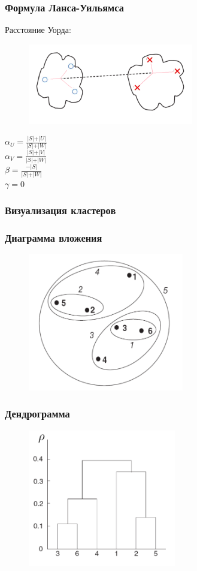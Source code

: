 \documentclass[12pt]{beamer}
\begin{document}
\begin{frame}\frametitle{Формула Ланса-Уильямса}
Расстояние Уорда:\\
\begin{figure}[htbp]
  \includegraphics[height=100pt, keepaspectratio = true]{images/lans4}  
\end{figure}

${\alpha_U = \frac{\vert S \vert + \vert U \vert}{\vert S \vert + \vert W \vert}}$\\${\alpha_V = \frac{\vert S \vert + \vert V \vert}{\vert S \vert + \vert W \vert}}$ \\${\beta = \frac{ -\vert S \vert}{\vert S \vert + \vert W \vert}}$ \\${\gamma = 0}$
\end{frame}

\begin{frame}\frametitle{Визуализация кластеров}
\end{frame}

\begin{frame}\frametitle{Диаграмма вложения}
\begin{figure}[htbp]
  \includegraphics[height=170pt, keepaspectratio = true]{images/diagram}  
\end{figure}
\end{frame}

\begin{frame}\frametitle{Дендрограмма}
\begin{figure}[htbp]
  \includegraphics[height=170pt, keepaspectratio = true]{images/dendrogram}  
\end{figure}
\end{frame}
\end{document}
